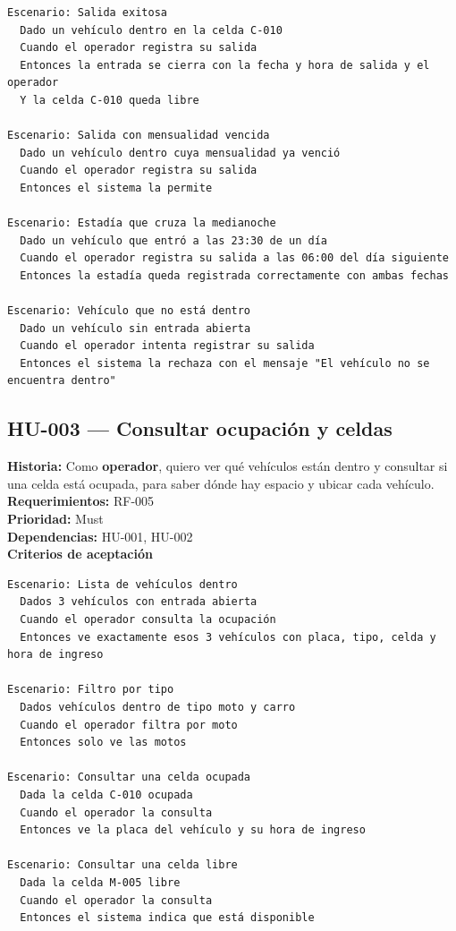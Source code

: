 \begin{lstlisting}[style=gherkin]
Escenario: Salida exitosa
  Dado un vehículo dentro en la celda C-010
  Cuando el operador registra su salida
  Entonces la entrada se cierra con la fecha y hora de salida y el operador
  Y la celda C-010 queda libre

Escenario: Salida con mensualidad vencida
  Dado un vehículo dentro cuya mensualidad ya venció
  Cuando el operador registra su salida
  Entonces el sistema la permite

Escenario: Estadía que cruza la medianoche
  Dado un vehículo que entró a las 23:30 de un día
  Cuando el operador registra su salida a las 06:00 del día siguiente
  Entonces la estadía queda registrada correctamente con ambas fechas

Escenario: Vehículo que no está dentro
  Dado un vehículo sin entrada abierta
  Cuando el operador intenta registrar su salida
  Entonces el sistema la rechaza con el mensaje "El vehículo no se encuentra dentro"
\end{lstlisting}

\subsection{HU-003 — Consultar ocupación y celdas}
\textbf{Historia:} Como \textbf{operador}, quiero ver qué vehículos están dentro y consultar si una celda está ocupada, para saber dónde hay espacio y ubicar cada vehículo.\\
\textbf{Requerimientos:} RF-005\\
\textbf{Prioridad:} Must\\
\textbf{Dependencias:} HU-001, HU-002\\
\textbf{Criterios de aceptación}

\begin{lstlisting}[style=gherkin]
Escenario: Lista de vehículos dentro
  Dados 3 vehículos con entrada abierta
  Cuando el operador consulta la ocupación
  Entonces ve exactamente esos 3 vehículos con placa, tipo, celda y hora de ingreso

Escenario: Filtro por tipo
  Dados vehículos dentro de tipo moto y carro
  Cuando el operador filtra por moto
  Entonces solo ve las motos

Escenario: Consultar una celda ocupada
  Dada la celda C-010 ocupada
  Cuando el operador la consulta
  Entonces ve la placa del vehículo y su hora de ingreso

Escenario: Consultar una celda libre
  Dada la celda M-005 libre
  Cuando el operador la consulta
  Entonces el sistema indica que está disponible
\end{lstlisting}

